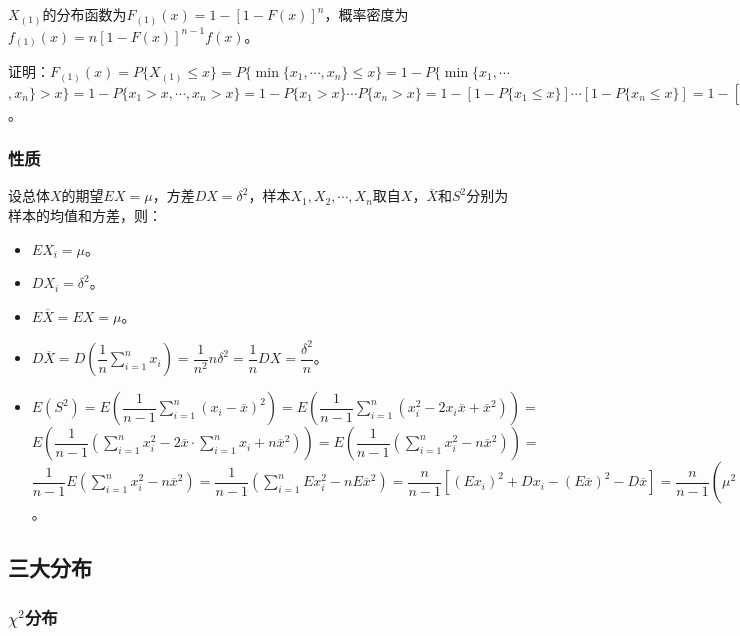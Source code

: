 \documentclass[UTF8, 12pt]{ctexart}
\begin{document}
$X_{(1)}$的分布函数为$F_{(1)}(x)=1-[1-F(x)]^n$，概率密度为$f_{(1)}(x)=n[1-F(x)]^{n-1}f(x)$。

证明：$F_{(1)}(x)=P\{X_{(1)}\leqslant x\}=P\{\min\{x_1,\cdots,x_n\}\leqslant x\}=1-P\{\min\{x_1,\cdots$\\$,x_n\}>x\}=1-P\{x_1>x,\cdots,x_n>x\}=1-P\{x_1>x\}\cdots P\{x_n>x\}=1-[1-P\{x_1\leqslant x\}]\cdots[1-P\{x_n\leqslant x\}]=1-[1-F_{(1)}(x)]\cdots[1-F_{(n)}(x)]=1-[1-F(x)]^n$。

\subsubsection{性质}

设总体$X$的期望$EX=\mu$，方差$DX=\delta^2$，样本$X_1,X_2,\cdots,X_n$取自$X$，$\overline{X}$和$S^2$分别为样本的均值和方差，则：

\begin{itemize}
    \item $EX_i=\mu$。
    \item $DX_i=\delta^2$。
    \item $E\overline{X}=EX=\mu$。
    \item $D\overline{X}=D\left(\dfrac{1}{n}\sum\limits_{i=1}^nx_i\right)=\dfrac{1}{n^2}n\delta^2=\dfrac{1}{n}DX=\dfrac{\delta^2}{n}$。
    \item $E(S^2)=E\left(\dfrac{1}{n-1}\sum\limits_{i=1}^n(x_i-\overline{x})^2\right)=E\left(\dfrac{1}{n-1}\sum\limits_{i=1}^n(x_i^2-2x_i\overline{x}+\overline{x}^2)\right)=$\\$E\left(\dfrac{1}{n-1}\left(\sum\limits_{i=1}^nx_i^2-2\overline{x}\cdot\sum\limits_{i=1}^nx_i+n\overline{x}^2\right)\right)=E\left(\dfrac{1}{n-1}\left(\sum\limits_{i=1}^nx_i^2-n\overline{x}^2\right)\right)=$\\$\dfrac{1}{n-1}E\left(\sum\limits_{i=1}^nx_i^2-n\overline{x}^2\right)=\dfrac{1}{n-1}\left(\sum\limits_{i=1}^nEx_i^2-nE\overline{x}^2\right)=\dfrac{n}{n-1}[(Ex_i)^2+Dx_i-(E\overline{x})^2-D\overline{x}]=\dfrac{n}{n-1}\left(\mu^2+\delta^2-\mu^2-\dfrac{\delta^2}{n}\right)=DX=\delta^2$。
\end{itemize}

\subsection{三大分布}

\subsubsection{\texorpdfstring{$\chi^2$分布}{}}
\end{document}
